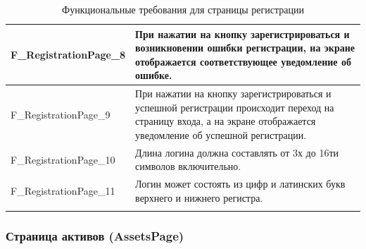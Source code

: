 \documentclass[a4paper, 14pt]{article}
\begin{document}
\begin{longtable}{| p{} | p{} |}
    F\_RegistrationPage\_8          & При нажатии на кнопку зарегистрироваться и возникновении ошибки регистрации, на экране отображается соответствующее уведомление об ошибке.                                         \\ \hline
    F\_RegistrationPage\_9          & При нажатии на кнопку зарегистрироваться и успешной регистрации происходит переход на страницу входа, а на экране отображается уведомление об успешной регистрации.                \\ \hline
    F\_RegistrationPage\_10         & Длина логина должна составлять от 3х до 16ти символов включительно.                                                                                                                \\ \hline
    F\_RegistrationPage\_11         & Логин может состоять из цифр и латинских букв верхнего и нижнего регистра.                                                                                                         \\ \hline

    \caption{Функциональные требования для страницы регистрации}
\end{longtable}

\subsubsection{Страница активов (AssetsPage)}
\end{document}
